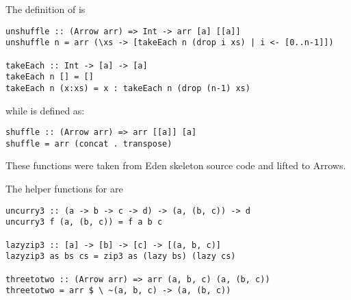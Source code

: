 The definition of  is
\begin{lstlisting}[frame=htrbl]
unshuffle :: (Arrow arr) => Int -> arr [a] [[a]]
unshuffle n = arr (\xs -> [takeEach n (drop i xs) | i <- [0..n-1]])

takeEach :: Int -> [a] -> [a]
takeEach n [] = []
takeEach n (x:xs) = x : takeEach n (drop (n-1) xs)
\end{lstlisting}
while  is defined as:
\begin{lstlisting}[frame=htrbl]
shuffle :: (Arrow arr) => arr [[a]] [a]
shuffle = arr (concat . transpose)
\end{lstlisting}
These functions were taken from Eden skeleton source code \cite{eden_skel_shuffle} and lifted to Arrows.


The helper functions for  are
\begin{lstlisting}[frame=htrbl]
uncurry3 :: (a -> b -> c -> d) -> (a, (b, c)) -> d
uncurry3 f (a, (b, c)) = f a b c

lazyzip3 :: [a] -> [b] -> [c] -> [(a, b, c)]
lazyzip3 as bs cs = zip3 as (lazy bs) (lazy cs)

threetotwo :: (Arrow arr) => arr (a, b, c) (a, (b, c))
threetotwo = arr $ \ ~(a, b, c) -> (a, (b, c))
\end{lstlisting} %



